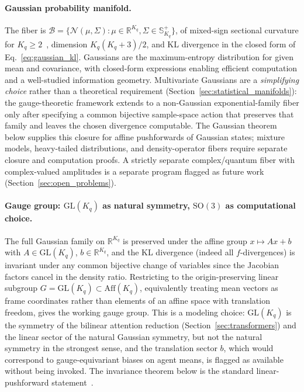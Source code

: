 \documentclass[11pt]{article}
\begin{document}
\paragraph{Gaussian probability manifold.}
The fiber is $\mathcal{B} = \{\mathcal{N}(\mu, \Sigma) : \mu \in \mathbb{R}^{K_q}, \Sigma \in \mathbb{S}^+_{K_q}\}$, of mixed-sign sectional curvature for $K_q \geq 2$~\cite{Skovgaard1984}, dimension $K_q(K_q+3)/2$, and KL divergence in the closed form of Eq.~\eqref{eq:gaussian_kl}. Gaussians are the maximum-entropy distribution for given mean and covariance, with closed-form expressions enabling efficient computation and a well-studied information geometry. Multivariate Gaussians are a \emph{simplifying choice} rather than a theoretical requirement (Section~\ref{sec:statistical_manifolds}): the gauge-theoretic framework extends to a non-Gaussian exponential-family fiber only after specifying a common bijective sample-space action that preserves that family and leaves the chosen divergence computable. The Gaussian theorem below supplies this closure for affine pushforwards of Gaussian states; mixture models, heavy-tailed distributions, and density-operator fibers require separate closure and computation proofs. A strictly separate complex/quantum fiber with complex-valued amplitudes is a separate program flagged as future work (Section~\ref{sec:open_problems}).

\paragraph{Gauge group: $\mathrm{GL}(K_q)$ as natural symmetry, $\mathrm{SO}(3)$ as computational choice.}
\label{sec:gauge_group_choice}
The full Gaussian family on $\mathbb{R}^{K_q}$ is preserved under the affine group $x \mapsto Ax + b$ with $A \in \mathrm{GL}(K_q)$, $b \in \mathbb{R}^{K_q}$, and the KL divergence (indeed all $f$-divergences) is invariant under any common bijective change of variables since the Jacobian factors cancel in the density ratio. Restricting to the origin-preserving linear subgroup $G = \mathrm{GL}(K_q) \subset \mathrm{Aff}(K_q)$, equivalently treating mean vectors as frame coordinates rather than elements of an affine space with translation freedom, gives the working gauge group. This is a modeling choice: $\mathrm{GL}(K_q)$ is the symmetry of the bilinear attention reduction (Section~\ref{sec:transformers}) and the linear sector of the natural Gaussian symmetry, but not the natural symmetry in the strongest sense, and the translation sector $b$, which would correspond to gauge-equivariant biases on agent means, is flagged as available without being invoked. The invariance theorem below is the standard linear-pushforward statement~\cite{Amari2016}.
\end{document}
